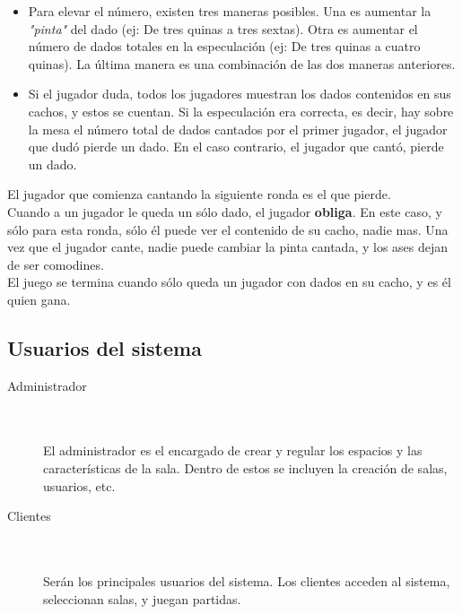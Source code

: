 \documentclass[a4paper,11pt]{article}
\begin{document}
\begin{itemize}
\item Para elevar el número, existen tres maneras posibles. Una es aumentar la 
\textit{"pinta"} del dado (ej: De tres quinas a tres sextas). Otra es aumentar
 el número de dados totales en la especulación (ej: De tres quinas a cuatro 
quinas). La última manera es una combinación de las dos maneras anteriores.
\item Si el jugador duda, todos los jugadores muestran los dados contenidos
en sus cachos, y estos se cuentan. Si la especulación era correcta, es decir,
hay sobre la mesa el número total de dados cantados por el primer jugador, el 
jugador que dudó pierde un dado. En el caso contrario, el jugador que cantó,
pierde un dado.
\end{itemize}

	El jugador que comienza cantando la siguiente ronda es el que pierde.\\

	Cuando a un jugador le queda un sólo dado, el jugador \textbf{obliga}.
En este caso, y sólo para esta ronda, sólo él puede ver el contenido de su 
cacho, nadie mas. Una vez que el jugador cante, nadie puede cambiar la pinta
cantada, y los ases dejan de ser comodines.\\

	El juego se termina cuando sólo queda un jugador con dados en su cacho,
y es él quien gana.\\


\subsection{Usuarios del sistema}

\begin{description}
	\item[Administrador] \hfill \\ \\
	El administrador es el encargado de crear y 
	regular los espacios y las características de la sala. Dentro de estos
	se incluyen la creación de salas, usuarios, etc.

	\item[Clientes] \hfill \\ \\
	Serán los principales usuarios del sistema. Los 
	clientes acceden al sistema, seleccionan salas, y juegan partidas.
\end{description}
\newpage	
\end{document}
